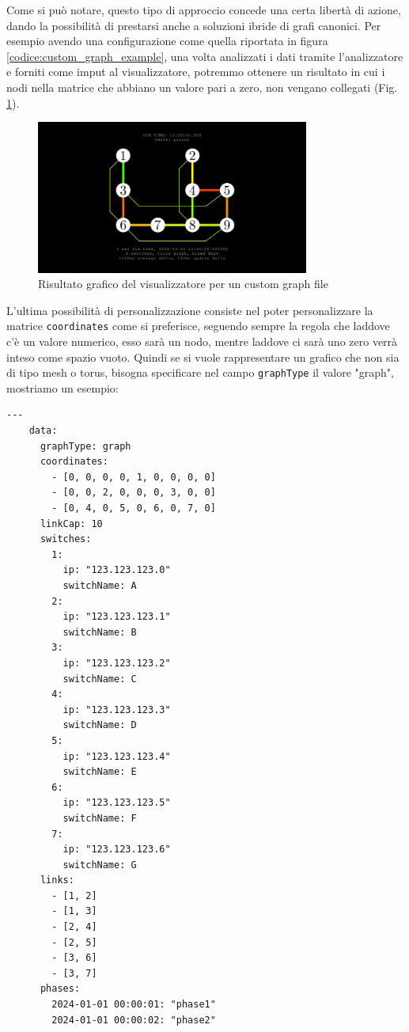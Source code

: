 \documentclass[binding=0.6cm]{sapthesis}
\begin{document}
Come si può notare, questo tipo di approccio concede una certa libertà di azione, dando la possibilità
di prestarsi anche a soluzioni ibride di grafi canonici.
Per esempio avendo una configurazione come quella riportata in figura \ref{codice:custom_graph_example},
una volta analizzati i dati tramite l'analizzatore e forniti come imput al visualizzatore, potremmo ottenere
un risultato in cui i nodi nella matrice che abbiano un valore pari a zero, non vengano
collegati (Fig. \ref{fig:hybrid_custom_torus}).
\begin{figure}[h]
    \centering
    \includegraphics[width=0.8\textwidth]{immagini/only_links.JPG}
    \caption{Risultato grafico del visualizzatore per un custom graph file}
    \label{fig:hybrid_custom_torus}
\end{figure}

L'ultima possibilità di personalizzazione consiste nel poter personalizzare la matrice \texttt{coordinates} come si preferisce, seguendo sempre la regola
che laddove c'è un valore numerico, esso sarà un nodo, mentre laddove ci sarà uno zero verrà inteso come spazio vuoto. Quindi se si vuole rappresentare
un grafico che non sia di tipo mesh o torus, bisogna specificare nel campo \texttt{graphType} il valore "graph", mostriamo un esempio:

{\scriptsize %
\begin{lstlisting}[caption={Esempio di custom graph file, \texttt{graphType} posto al valore graph}]
    ---
    data:
      graphType: graph
      coordinates:
        - [0, 0, 0, 0, 1, 0, 0, 0, 0]
        - [0, 0, 2, 0, 0, 0, 3, 0, 0]
        - [0, 4, 0, 5, 0, 6, 0, 7, 0]
      linkCap: 10
      switches:
        1:
          ip: "123.123.123.0"
          switchName: A
        2:
          ip: "123.123.123.1"
          switchName: B
        3:
          ip: "123.123.123.2"
          switchName: C
        4:
          ip: "123.123.123.3"
          switchName: D
        5:
          ip: "123.123.123.4"
          switchName: E
        6:
          ip: "123.123.123.5"
          switchName: F
        7:
          ip: "123.123.123.6"
          switchName: G
      links:
        - [1, 2]
        - [1, 3]
        - [2, 4]
        - [2, 5]
        - [3, 6]
        - [3, 7]
      phases:
        2024-01-01 00:00:01: "phase1"
        2024-01-01 00:00:02: "phase2"
\end{lstlisting}
}
\end{document}
